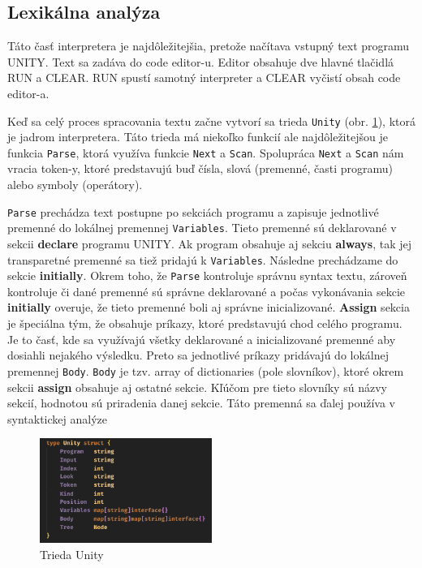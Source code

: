 \subsection{Lexikálna analýza}
Táto časť interpretera je najdôležitejšia, pretože načítava vstupný text programu UNITY. Text sa zadáva
do code editor-u. Editor obsahuje dve hlavné tlačidlá RUN a CLEAR. RUN spustí samotný interpreter a CLEAR
vyčistí obsah code editor-a. 

Keď sa celý proces spracovania textu začne vytvorí sa trieda \texttt{Unity} (obr. \ref{img:unity}), ktorá je 
jadrom interpretera. Táto trieda má niekoľko funkcií ale najdôležitejšou je funkcia \texttt{Parse}, 
ktorá využíva funkcie \texttt{Next} a \texttt{Scan}. Spolupráca \texttt{Next} a \texttt{Scan} nám vracia 
token-y, ktoré predstavujú buď čísla, slová (premenné, časti programu) alebo symboly (operátory). 

\texttt{Parse} prechádza text postupne po sekciách programu a zapisuje jednotlivé premenné do lokálnej 
premennej \texttt{Variables}. Tieto premenné sú deklarované v sekcii \textbf{declare} programu UNITY. 
Ak program obsahuje aj sekciu \textbf{always}, tak jej transparetné premenné sa tiež pridajú k \texttt{Variables}.
Následne prechádzame do sekcie \textbf{initially}. Okrem toho, že \texttt{Parse} kontroluje správnu syntax
textu, zároveň kontroluje či dané premenné sú správne deklarované a počas vykonávania sekcie \textbf{initially}
overuje, že tieto premenné boli aj správne inicializované. \textbf{Assign} sekcia je špeciálna tým, že 
obsahuje príkazy, ktoré predstavujú chod celého programu. Je to časť, kde sa využívajú všetky deklarované a
inicializované premenné aby dosiahli nejakého výsledku. Preto sa jednotlivé príkazy pridávajú do lokálnej
premennej \texttt{Body}. \texttt{Body} je tzv. array of dictionaries (pole slovníkov), 
ktoré okrem sekcii \textbf{assign} obsahuje aj ostatné sekcie. Kľúčom pre tieto slovníky sú názvy sekcií, 
hodnotou sú priradenia danej sekcie. Táto premenná sa ďalej používa v syntaktickej analýze

\begin{figure}[H]
    \centerline{\includegraphics[width=0.5\textwidth]{images/unity}}
    \caption[Trieda Unity]{Trieda Unity}
    \label{img:unity}
\end{figure}

